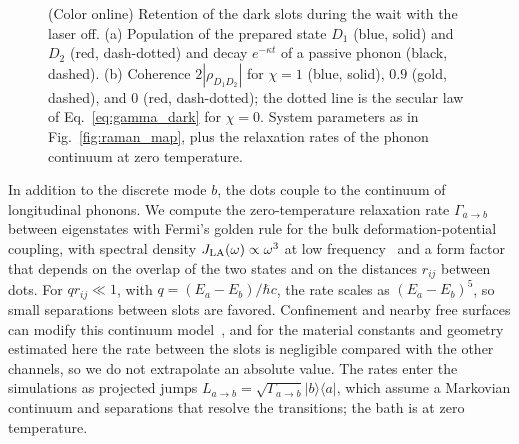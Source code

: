 \documentclass[aps,pra,preprint,groupedaddress,amsmath,amssymb,floatfix]{revtex4-2}
\newcommand{\ket}[1]{\lvert #1\rangle}
\newcommand{\bra}[1]{\langle #1\rvert}
\begin{document}
\begin{figure}[t]
\centering
\resizebox{\columnwidth}{!}{}
\caption{(Color online) Retention of the dark slots during the wait with the laser off. (a) Population of the prepared state $D_1$ (blue, solid) and $D_2$ (red, dash-dotted) and decay $e^{-\kappa t}$ of a passive phonon (black, dashed). (b) Coherence $2|\rho_{D_1D_2}|$ for $\chi=1$ (blue, solid), $0.9$ (gold, dashed), and $0$ (red, dash-dotted); the dotted line is the secular law of Eq.~\eqref{eq:gamma_dark} for $\chi=0$. System parameters as in Fig.~\ref{fig:raman_map}, plus the relaxation rates of the phonon continuum at zero temperature.}
\label{fig:storage}
\end{figure}

In addition to the discrete mode $b$, the dots couple to the continuum of longitudinal phonons. We compute the zero-temperature relaxation rate $\Gamma_{a\to b}$ between eigenstates with Fermi's golden rule for the bulk deformation-potential coupling, with spectral density $J_{\rm LA}(\omega)\propto\omega^3$ at low frequency~\cite{krummheuer2002} and a form factor that depends on the overlap of the two states and on the distances $r_{ij}$ between dots. For $qr_{ij}\ll1$, with $q=(E_a-E_b)/\hbar c$, the rate scales as $(E_a-E_b)^5$, so small separations between slots are favored. Confinement and nearby free surfaces can modify this continuum model~\cite{krummheuer2005}, and for the material constants and geometry estimated here the rate between the slots is negligible compared with the other channels, so we do not extrapolate an absolute value. The rates enter the simulations as projected jumps $L_{a\to b}=\sqrt{\Gamma_{a\to b}}\ket b\bra a$, which assume a Markovian continuum and separations that resolve the transitions; the bath is at zero temperature.
\end{document}
